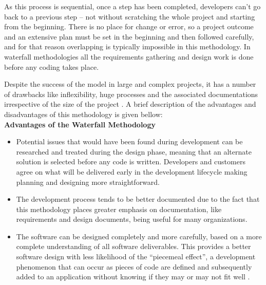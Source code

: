 As this process is sequential, once a step has been completed, developers can’t go back to a previous step – not without scratching the whole project and starting from the beginning. There is no place for change or error, so a project outcome and an extensive plan must be set in the beginning and then followed carefully, and for that reason overlapping is typically impossible in this methodology.
In waterfall methodologies all the requirements gathering and design work is done before any coding takes place.
 
Despite the success of the model in large and complex projects, it has a number of drawbacks like inflexibility, huge processes and the associated documentations irrespective of the size of the project \cite{method:Tommy2016}. A brief description of the advantages and disadvantages of this methodology is given bellow:\\

\textbf{Advantages of the Waterfall Methodology}
\begin{itemize}

\item Potential issues that would have been found during development can be researched and treated during the design phase, meaning that an alternate solution is selected before any code is written. Developers and customers agree on what will be delivered early in the development lifecycle making planning and designing more straightforward.\\

\item The development process tends to be better documented due to the fact that this methodology places greater emphasis on documentation, like requirements and design documents, being useful for many organizations.\\

\item The software can be designed completely and more carefully, based on a more complete understanding of all software deliverables. This provides a better software design with less likelihood of the “piecemeal effect”, a development phenomenon that can occur as pieces of code are defined and subsequently added to an application without knowing if they may or may not fit well \cite{waterfall:piecemeal}.
\end{itemize}

